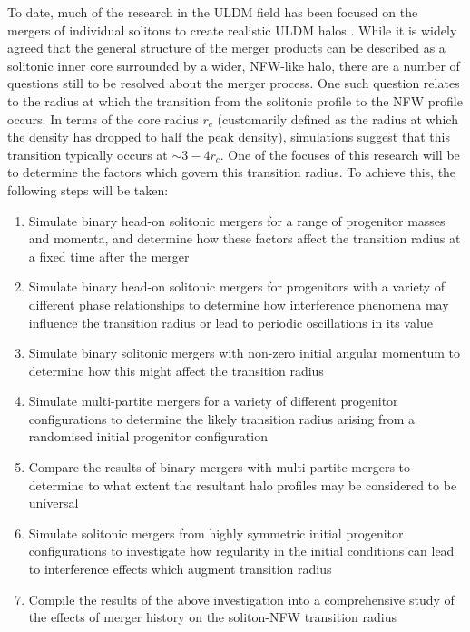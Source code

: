 To date, much of the research in the ULDM field has been focused on the mergers of individual solitons to create realistic ULDM halos \cite{Veltmaat:2016rxo, Schive:2014hza}. While it is widely agreed that the general structure of the merger products can be described as a solitonic inner core surrounded by a wider, NFW-like halo, there are a number of questions still to be resolved about the merger process. One such question relates to the radius at which the transition from the solitonic profile to the NFW profile occurs. In terms of the core radius $r_c$ (customarily defined as the radius at which the density has dropped to half the peak density), simulations suggest that this transition typically occurs at $\sim 3-4r_c$. One of the focuses of this research will be to determine the factors which govern this transition radius. To achieve this, the following steps will be taken:
\begin{enumerate}
    \item Simulate binary head-on solitonic mergers for a range of progenitor masses and momenta, and determine how these factors affect the transition radius at a fixed time after the merger
    \item Simulate binary head-on solitonic mergers for progenitors with a variety of different phase relationships to determine how interference phenomena may influence the transition radius or lead to periodic oscillations in its value
    \item Simulate binary solitonic mergers with non-zero initial angular momentum to determine how this might affect the transition radius
    \item Simulate multi-partite mergers for a variety of different progenitor configurations to determine the likely transition radius arising from a randomised initial progenitor configuration
    \item Compare the results of binary mergers with multi-partite mergers to determine to what extent the resultant halo profiles may be considered to be universal
    \item Simulate solitonic mergers from highly symmetric initial progenitor configurations to investigate how regularity in the initial conditions can lead to interference effects which augment transition radius
    \item Compile  the results of the above investigation into a comprehensive study of the effects of merger history on the soliton-NFW transition radius 
    
\end{enumerate}

